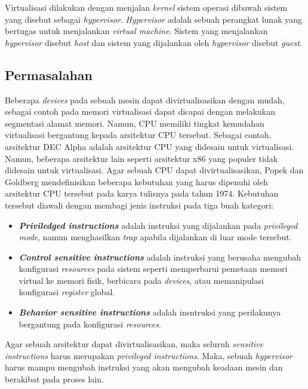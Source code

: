 Virtualisasi dilakukan dengan menjalan \textit{kernel} sistem operasi dibawah sistem yang disebut sebagai
\textit{hypervisor}. \textit{Hypervisor} adalah sebuah perangkat lunak yang bertugas untuk menjalankan \textit{virtual
machine}. Sistem yang menjalankan \textit{hypervisor} disebut \textit{host} dan sistem yang dijalankan oleh
\textit{hypervisor} disebut \textit{guest}.

\subsection{Permasalahan}

Beberapa \textit{devices} pada sebuah mesin dapat divirtualisasikan dengan mudah, sebagai contoh pada memori
virtualisasi dapat dicapai dengan melakukan segmentasi alamat memori. Namun, CPU memiliki tingkat kemudahan virtualisasi
bergantung kepada arsitektur CPU tersebut. Sebagai contoh, arsitektur DEC Alpha adalah arsitektur CPU yang didesain
untuk virtualisasi. Namun, beberapa arsitektur lain seperti arsitektur x86 yang populer tidak didesain untuk
virtualisasi. Agar sebuah CPU dapat divirtualisasikan, Popek dan Goldberg mendefinisikan beberapa kebutuhan yang harus
dipenuhi oleh arsitektur CPU tersebut pada karya tulisnya pada tahun 1974. Kebutuhan tersebut diawali dengan membagi
jenis instruksi pada tiga buah kategori:

\begin{itemize}

    \item \textit{\textbf{Priviledged instructions}} adalah instruksi yang dijalankan pada \textit{privileged mode},
        namun menghasilkan \textit{trap} apabila dijalankan di luar mode tersebut.

    \item \textit{\textbf{Control sensitive instructions}} adalah instruksi yang berusaha mengubah konfigurasi
        \textit{resources} pada sistem seperti memperbarui pemetaan memori virtual ke memori fisik, berbicara pada
        \textit{devices}, atau memanipulasi konfigurasi \textit{register} global.

    \item \textit{\textbf{Behavior sensitive instructions}} adalah insntruksi yang perilakunya bergantung pada
        konfigurasi \textit{resources}.

\end{itemize}

Agar sebuah arsitektur dapat divirtualisasikan, maka seluruh \textit{sensitive instructions} harus merupakan
\textit{privileged instructions}. Maka, sebuah \textit{hypervisor} harus mampu mengubah instruksi yang akan mengubah
keadaan mesin dan berakibat pada proses lain.


